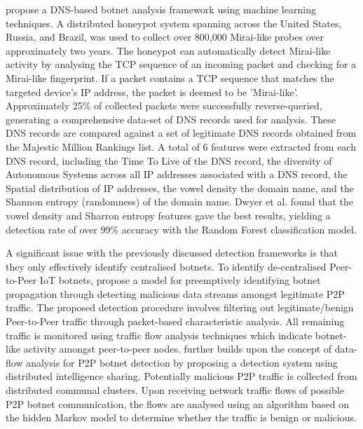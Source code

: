 \citet{Dwyer2019} propose a DNS-based botnet analysis framework using machine learning techniques. A distributed honeypot system spanning across the United States, Russia, and Brazil, was used to collect over 800,000 Mirai-like probes over approximately two years. The honeypot can automatically detect Mirai-like activity by analysing the TCP sequence of an incoming packet and checking for a Mirai-like fingerprint. If a packet contains a TCP sequence that matches the targeted device's IP address, the packet is deemed to be 'Mirai-like'. Approximately 25\% of collected packets were successfully reverse-queried, generating a comprehensive data-set of DNS records used for analysis. These DNS records are compared against a set of legitimate DNS records obtained from the Majestic Million Rankings list. A total of 6 features were extracted from each DNS record, including the Time To Live of the DNS record, the diversity of Autonomous Systems across all IP addresses associated with a DNS record, the Spatial distribution of IP addresses, the vowel density the domain name, and the Shannon entropy (randomness) of the domain name. Dwyer et al. found that the vowel density and Sharron entropy features gave the best results, yielding a detection rate of over 99\% accuracy with the Random Forest classification model.

A significant issue with the previously discussed detection frameworks is that they only effectively identify centralised botnets. To identify de-centralised Peer-to-Peer IoT botnets, \citet{Wang2017} propose a model for preemptively identifying botnet propagation through detecting malicious data streams amongst legitimate P2P traffic. The proposed detection procedure involves filtering out legitimate/benign Peer-to-Peer traffic through packet-based characteristic analysis. All remaining traffic is monitored using traffic flow analysis techniques which indicate botnet-like activity amongst peer-to-peer nodes. \citet{Li2019} further builds upon the concept of data-flow analysis for P2P botnet detection by proposing a detection system using distributed intelligence sharing. Potentially malicious P2P traffic is collected from distributed communal clusters. Upon receiving network traffic flows of possible P2P botnet communication, the flows are analysed using an algorithm based on the hidden Markov model to determine whether the traffic is benign or malicious.


